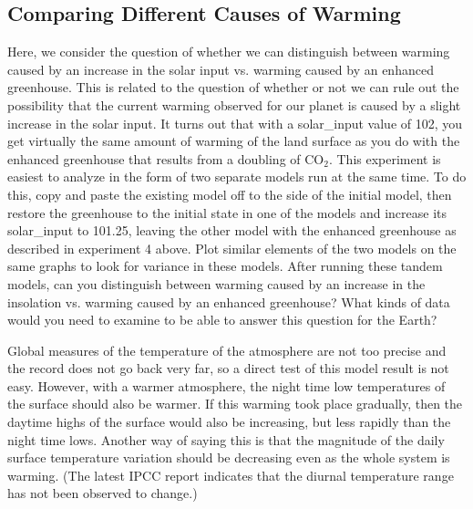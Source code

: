 \documentclass[11pt,letterpaper]{article}
\begin{document}
\subsection{Comparing Different Causes of Warming}
Here, we consider the question of whether we can distinguish between warming caused by an increase in the solar input vs. warming
caused by an enhanced greenhouse. This is related to the question of whether or not we can rule out the possibility that the current
warming observed for our planet is caused by a slight increase in the solar input. It turns out that with a solar\_input value of 102, you
get virtually the same amount of warming of the land surface as you do with the enhanced greenhouse that results from a doubling of
CO$_2$. This experiment is easiest to analyze in the form of two separate models run at the same time. To do this, copy and paste the
existing model off to the side of the initial model, then restore the greenhouse to the initial state in one of the models and increase its
solar\_input to 101.25, leaving the other model with the enhanced greenhouse as described in experiment 4 above. Plot similar elements
of the two models on the same graphs to look for variance in these models. After running these tandem models, can you distinguish between warming caused by an increase in the insolation vs. warming caused by an enhanced greenhouse? What kinds of data would you need to examine to be able to answer this question for the Earth?

Global measures of the temperature of the atmosphere are not too precise and the record does not go back very far, so a direct test of this
model result is not easy. However, with a warmer atmosphere, the night time low temperatures of the surface should also be warmer. If
this warming took place gradually, then the daytime highs of the surface would also be increasing, but less rapidly than the night time
lows. Another way of saying this is that the magnitude of the daily surface temperature variation should be decreasing even as the
whole system is warming. (The latest IPCC report indicates that the diurnal temperature range has not been observed to change.)
\end{document}
